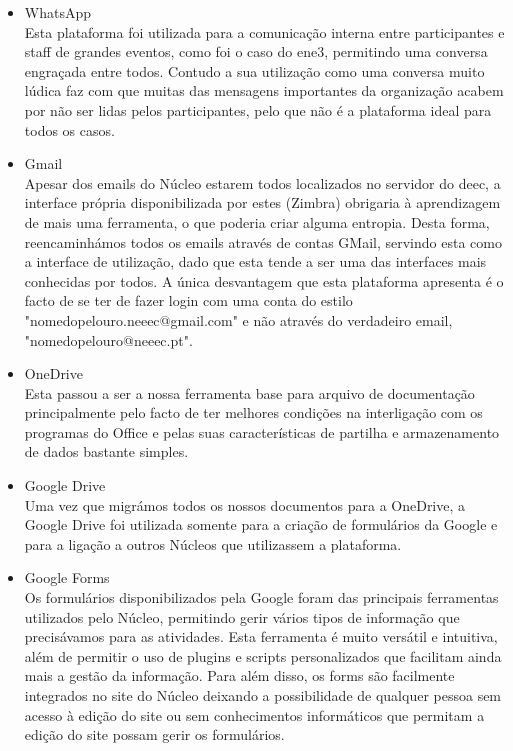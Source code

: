 \begin{itemize}
\item WhatsApp\\
Esta plataforma foi utilizada para a comunicação interna entre participantes e staff de grandes eventos, como foi o caso do \acrshort{ene3}, permitindo uma conversa engraçada entre todos. Contudo a sua utilização como uma conversa muito lúdica faz com que muitas das mensagens importantes da organização acabem por não ser lidas pelos participantes, pelo que não é a plataforma ideal para todos os casos.

\item Gmail\\
Apesar dos emails do Núcleo estarem todos localizados no servidor do \acrshort{deec}, a interface própria disponibilizada por estes (Zimbra) obrigaria à aprendizagem de mais uma ferramenta, o que poderia criar alguma entropia. Desta forma, reencaminhámos todos os emails através de contas GMail, servindo esta como a interface de utilização, dado que esta tende a ser uma das interfaces mais conhecidas por todos. A única desvantagem que esta plataforma apresenta é o facto de se ter de fazer login com uma conta do estilo "nomedopelouro.neeec@gmail.com" e não através do verdadeiro email, "nomedopelouro@neeec.pt".

\item OneDrive\\
Esta passou a ser a nossa ferramenta base para arquivo de documentação principalmente pelo facto de ter melhores condições na interligação com os programas do Office e pelas suas características de partilha e armazenamento de dados bastante simples.

\item Google Drive\\
Uma vez que migrámos todos os nossos documentos para a OneDrive, a Google Drive foi utilizada somente para a criação de formulários da Google e para a ligação a outros Núcleos que utilizassem a plataforma.

\item Google Forms\\
Os formulários disponibilizados pela Google foram das principais ferramentas utilizados pelo Núcleo, permitindo gerir vários tipos de informação que precisávamos para as atividades. Esta ferramenta é muito versátil e intuitiva, além de permitir o uso de plugins e scripts personalizados que facilitam ainda mais a gestão da informação. Para além disso, os forms são facilmente integrados no site do Núcleo deixando a possibilidade de qualquer pessoa sem acesso à edição do site ou sem conhecimentos informáticos que permitam a edição do site possam gerir os formulários.


\end{itemize}
